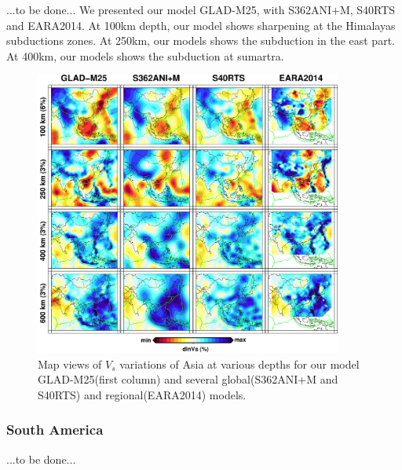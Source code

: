 \documentclass[extra,mreferee]{gji}
\begin{document}
...to be done...
We presented our model GLAD-M25, with S362ANI+M, S40RTS and EARA2014.
At 100km depth, our model shows sharpening at the Himalayas subductions
zones. At 250km, our models shows the subduction in the east part.
At 400km, our models shows the subduction at sumartra.


\begin{figure}
\includegraphics[width=0.9\textwidth]{figures/depth_slice/asia_vs.pdf}
  \caption{Map views of $V_s$ variations of Asia at various depths for our model GLAD-M25(first column) and several global(S362ANI+M and S40RTS) and regional(EARA2014\citep{chen2015multiparameter}) models.}
\label{fig:asia-vs}
\centering
\end{figure}

\subsubsection{South America}
...to be done...
\end{document}
